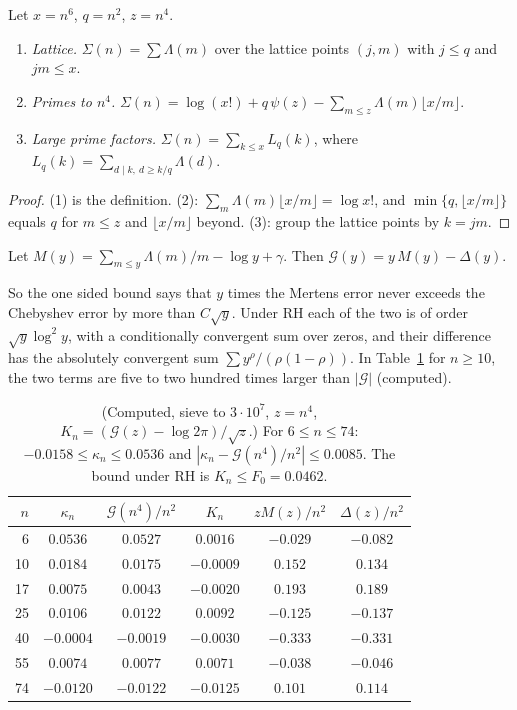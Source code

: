 \begin{proposition}\label{lt:prop:faces}
Let $x=n^6$, $q=n^2$, $z=n^4$.
\begin{enumerate}
\item \emph{Lattice.} $\Sigma(n)=\sum\Lambda(m)$ over the lattice points $(j,m)$ with $j\le q$ and $jm\le x$.
\item \emph{Primes to $n^4$.} $\Sigma(n)=\log(x!)+q\,\psi(z)-\sum_{m\le z}\Lambda(m)\lfloor x/m\rfloor$.
\item \emph{Large prime factors.} $\Sigma(n)=\sum_{k\le x}L_q(k)$, where $L_q(k)=\sum_{d\mid k,\ d\ge k/q}\Lambda(d)$.
\end{enumerate}
\end{proposition}

\begin{proof}
(1) is the definition. (2): $\sum_m\Lambda(m)\lfloor x/m\rfloor=\log x!$, and $\min\{q,\lfloor x/m\rfloor\}$ equals $q$ for $m\le z$ and $\lfloor x/m\rfloor$ beyond. (3): group the lattice points by $k=jm$.
\end{proof}


\begin{proposition}\label{lt:prop:MD}
Let $M(y)=\sum_{m\le y}\Lambda(m)/m-\log y+\gamma$. Then $\mathcal G(y)=y\,M(y)-\Delta(y)$.
\end{proposition}

So the one sided bound says that $y$ times the Mertens error never exceeds the Chebyshev error by more than $C\sqrt y$. Under RH each of the two is of order $\sqrt y\log^2y$, with a conditionally convergent sum over zeros, and their difference has the absolutely convergent sum $\sum y^\rho/(\rho(1-\rho))$. In Table~\ref{lt:tab:data} for $n\ge10$, the two terms are five to two hundred times larger than $|\mathcal G|$ (computed).

\begin{table}[h]
\centering\footnotesize
\begin{tabular}{rccccc}
\toprule
$n$ & $\kappa_n$ & $\mathcal G(n^4)/n^2$ & $K_n$ & $zM(z)/n^2$ & $\Delta(z)/n^2$\\
\midrule
6 & $0.0536$ & $0.0527$ & $0.0016$ & $-0.029$ & $-0.082$\\
10 & $0.0184$ & $0.0175$ & $-0.0009$ & $0.152$ & $0.134$\\
17 & $0.0075$ & $0.0043$ & $-0.0020$ & $0.193$ & $0.189$\\
25 & $0.0106$ & $0.0122$ & $0.0092$ & $-0.125$ & $-0.137$\\
40 & $-0.0004$ & $-0.0019$ & $-0.0030$ & $-0.333$ & $-0.331$\\
55 & $0.0074$ & $0.0077$ & $0.0071$ & $-0.038$ & $-0.046$\\
74 & $-0.0120$ & $-0.0122$ & $-0.0125$ & $0.101$ & $0.114$\\
\bottomrule
\end{tabular}
\caption{(Computed, sieve to $3\cdot10^7$, $z=n^4$, $K_n=(\mathcal G(z)-\log2\pi)/\sqrt z$.) For $6\le n\le74$: $-0.0158\le\kappa_n\le0.0536$ and $|\kappa_n-\mathcal G(n^4)/n^2|\le0.0085$. The bound under RH is $K_n\le F_0=0.0462$.}\label{lt:tab:data}
\end{table}

